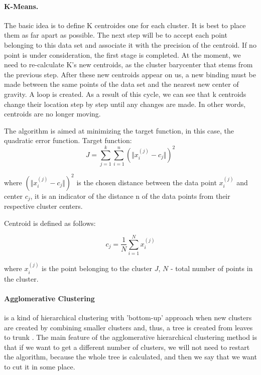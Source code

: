 \documentclass[11pt]{article}
\begin{document}
\paragraph{K-Means.} The basic idea is to define K centroides one for each cluster. It is best to place them as far apart as possible. The next step will be to accept each point belonging to this data set and associate it with the precision of the centroid. If no point is under consideration, the first stage is completed. At the moment, we need to re-calculate K's new centroids, as the cluster barycenter that stems from the previous step. After these new centroids appear on us, a new binding must be made between the same points of the data set and the nearest new center of gravity. A loop is created. As a result of this cycle, we can see that k centroids change their location step by step until any changes are made. In other words, centroids are no longer moving.

The algorithm is aimed at minimizing the target function, in this case, the quadratic error function. Target function:
\begin{equation}
J = \sum_{j=1}^{k} \sum_{i=1}^{n} (\Vert x_{i}^{(j)} - c_{j} \Vert)^{2}
\end{equation}

where $(\Vert x_{i}^{(j)} - c_{j} \Vert)^{2}$ is the chosen distance between the data point $x_{i}^{(j)}$ and center $c_{j}$, it is an indicator of the distance n of the data points from their respective cluster centers.

Centroid is defined as follows:

\begin{equation}
c_{j} = \dfrac{1}{N} \sum_{i=1}^{N} x_{i}^{(j)}
\end{equation}

where $x_{i}^{(j)}$ is the point belonging to the cluster $J$, $N$ - total number of points in the cluster.

\paragraph{Agglomerative Clustering} is a kind of hierarchical clustering with 'bottom-up' approach when new clusters are created by combining smaller clusters and, thus, a tree is created from leaves to trunk \cite{ward63:_hierar_group_optim_objec_funct}. The main feature of the agglomerative hierarchical clustering method is that if we want to get a different number of clusters, we will not need to restart the algorithm, because the whole tree is calculated, and then we say that we want to cut it in some place.
\end{document}

